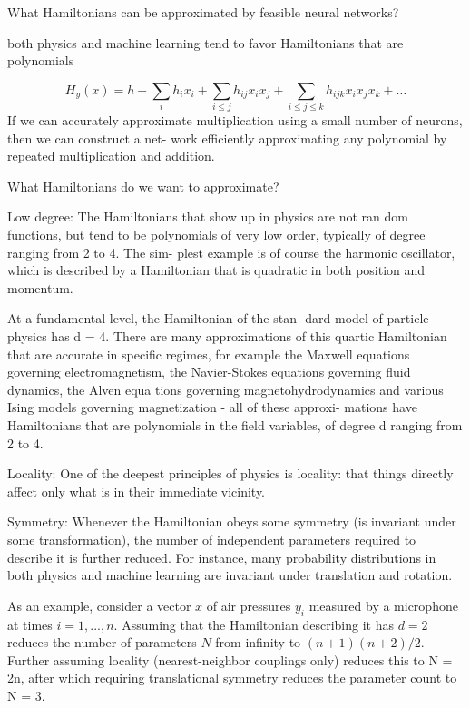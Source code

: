 \documentclass[english]{article}
\begin{document}
\item What Hamiltonians can be approximated by
feasible neural networks?

both physics and machine learning tend to favor Hamiltonians that are polynomials 

$$H_y(x)= 
h+
\sum_i h_i x_i +
\sum_{i\le j} h_{ij} x_i x_j +
\sum_{i\le j\le k} h_{ijk} x_i x_j x_k +\ldots
$$
If we can accurately approximate multiplication using a
small number of neurons, then we can construct a net-
work efficiently approximating any polynomial by
repeated multiplication and addition.

\item What Hamiltonians do we want to
approximate?

\benum 
\item 
Low degree: The Hamiltonians that show up in physics are not ran
dom functions, but tend to be polynomials of very low
order, typically of degree ranging from 2 to 4. The sim-
plest example is of course the harmonic oscillator, which
is described by a Hamiltonian that is quadratic in both
position and momentum.

At a fundamental level, the Hamiltonian of the stan-
dard model of particle physics has d = 4. There are
many approximations of this quartic Hamiltonian that
are accurate in specific regimes, for example the Maxwell
equations governing electromagnetism, the Navier-Stokes
equations governing fluid dynamics, the Alven equa
tions governing magnetohydrodynamics and various Ising
models governing magnetization - all of these approxi-
mations have Hamiltonians that are polynomials in the
field variables, of degree d ranging from 2 to 4.

\item 
Locality: One of the deepest principles of physics is locality: that things directly affect only what is in their immediate
vicinity.

\item Symmetry:
Whenever the Hamiltonian obeys some symmetry (is invariant under some transformation), the number of independent parameters required to describe it is further
reduced. For instance, many probability distributions in
both physics and machine learning are invariant under
translation and rotation. 

As an example, consider a vector $x$ of air pressures $y_i$ measured by a microphone at
times $i = 1,...,n$. Assuming that the Hamiltonian describing it has $d = 2$ reduces the number of parameters
$N$ from infinity to $(n + 1)(n + 2)/2$. Further assuming locality (nearest-neighbor couplings only) reduces this to
N = 2n, after which requiring translational symmetry
reduces the parameter count to N = 3. 
\end{document}
